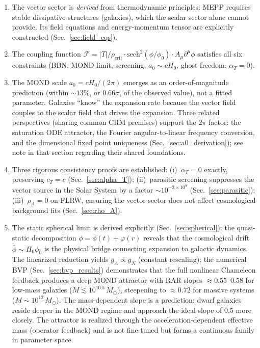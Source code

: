 \documentclass[aps,prd,twocolumn,superscriptaddress,nofootinbib]{revtex4-2}
\begin{document}
\begin{enumerate}
\item The vector sector is \textit{derived} from thermodynamic principles: MEPP requires stable dissipative structures (galaxies), which the scalar sector alone cannot provide. Its field equations and energy-momentum tensor are explicitly constructed (Sec.~\ref{sec:field_eqs}).

\item The coupling function $\mathcal{F} = |T|/\rho_{\mathrm{crit}} \cdot \mathrm{sech}^2(\phi/\phi_0) \cdot A_\mu\partial^\mu\phi$ satisfies all six constraints (BBN, MOND limit, screening, $a_0 \sim cH_0$, ghost freedom, $\alpha_T = 0$).

\item The MOND scale $a_0 = cH_0/(2\pi)$ emerges as an order-of-magnitude prediction (within $\sim 13\%$, or $0.66\sigma$, of the observed value), not a fitted parameter. Galaxies ``know'' the expansion rate because the vector field couples to the scalar field that drives the expansion. Three related perspectives (sharing common CRM premises) support the $2\pi$ factor: the saturation ODE attractor, the Fourier angular-to-linear frequency conversion, and the dimensional fixed point uniqueness (Sec.~\ref{sec:a0_derivation}); see note in that section regarding their shared foundations.

\item Three rigorous consistency proofs are established: (i)~$\alpha_T = 0$ exactly, preserving $c_T = c$ (Sec.~\ref{sec:alpha_T}); (ii)~parasitic screening suppresses the vector source in the Solar System by a factor $\sim 10^{-3 \times 10^9}$ (Sec.~\ref{sec:parasitic}); (iii)~$\rho_A = 0$ on FLRW, ensuring the vector sector does not affect cosmological background fits (Sec.~\ref{sec:rho_A}).

\item The static spherical limit is derived explicitly (Sec.~\ref{sec:spherical}): the quasi-static decomposition $\phi = \bar{\phi}(t) + \varphi(r)$ reveals that the cosmological drift $\dot{\bar{\phi}} \sim H_0\phi_0$ is the physical bridge connecting expansion to galactic dynamics. The linearized reduction yields $g_A \propto g_N$ (constant rescaling); the numerical BVP (Sec.~\ref{sec:bvp_results}) demonstrates that the full nonlinear Chameleon feedback produces a deep-MOND attractor with RAR slopes $\approx 0.55$--$0.58$ for low-mass galaxies ($M \lesssim 10^{10.5}\,M_\odot$), steepening to $\approx 0.72$ for massive systems ($M \sim 10^{12}\,M_\odot$). The mass-dependent slope is a prediction: dwarf galaxies reside deeper in the MOND regime and approach the ideal slope of $0.5$ more closely. The attractor is realized through the acceleration-dependent effective mass (operator feedback) and is not fine-tuned but forms a continuous family in parameter space.


\end{enumerate}
\end{document}

